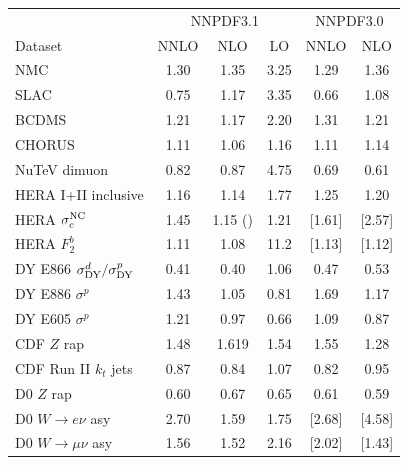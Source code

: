 \begin{table}[h]
\begin{center}
  \scriptsize
      \renewcommand{\arraystretch}{1.10}
\begin{tabular}{|l|c|c|c||c|c|}
\hline
  & \multicolumn{3}{c||}{NNPDF3.1  } & \multicolumn{2}{c|}{NNPDF3.0 } 
\\Dataset  &  NNLO  & NLO & LO  & NNLO  & NLO  \\
\hline
\hline
NMC    &    1.30     &   1.35   &     3.25       &   1.29   &   1.36  \\    
SLAC    &    0.75      &   1.17   &   3.35       &   0.66   &   1.08  \\    
BCDMS    &    1.21      &   1.17   &  2.20        &   1.31   &   1.21  \\    
CHORUS    &    1.11      &   1.06   &   1.16      &   1.11   &   1.14  \\    
NuTeV dimuon    &    0.82      &   0.87   &  4.75         &   0.69  &   0.61  \\    
\hline
HERA I+II inclusive    &    1.16      &   1.14   &  1.77         &   1.25   &   1.20  \\      
HERA $\sigma_c^{\rm NC}$    &    1.45      &   1.15 ()   &  1.21           &  [1.61]   &   [2.57]  \\    
HERA $F_2^b$    &    1.11      &   1.08   &   11.2           &   [1.13]   &   [1.12]  \\    
\hline
\hline
DY E866 $\sigma^d_{\rm DY}/\sigma^p_{\rm DY}$ &    0.41     &   0.40   &     1.06       &   0.47   &   0.53  \\    
DY E886 $\sigma^p$    &    1.43     &   1.05   &    0.81       &   1.69   &   1.17  \\    
DY E605  $\sigma^p$   &    1.21     &   0.97   &  0.66      &   1.09   &   0.87  \\    
\hline
CDF $Z$ rap    &    1.48     &   1.619   &    1.54         &   1.55   &   1.28  \\    
CDF Run II $k_t$ jets    &    0.87      &   0.84   &  1.07           &   0.82   &   0.95  \\    
\hline
D0 $Z$ rap    &    0.60      &   0.67   &    0.65         &   0.61   &   0.59  \\    
D0 $W\to e\nu$  asy   &    2.70      &   1.59   &   1.75         &   [2.68]   &   [4.58]  \\    
D0 $W\to \mu\nu$  asy    &    1.56      &   1.52   &    2.16          &   [2.02]   &   [1.43]  \\    

\end{tabular}
\end{center}
\end{table}
